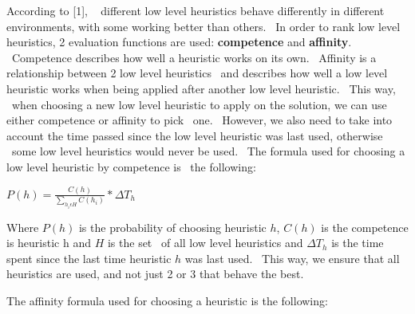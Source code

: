%


 According to [1], \ %
different low level heuristics behave differently in different environments, with some working better than others. \
In order to rank low level heuristics, 2 evaluation functions are used: \textbf{competence} and \textbf{affinity}. \
Competence describes how well a heuristic works on its own. \
Affinity is a relationship between 2 low level heuristics \
and describes how well a low level heuristic works when being applied after another low level heuristic. \
This way, \
when choosing a new low level heuristic to apply on the solution, we can use either competence or affinity to pick \
one. \
However, we also need to take into account the time passed since the low level heuristic was last used, otherwise \
some low level heuristics would never be used. \
The formula used for choosing a low level heuristic by competence is \
the following:

\( P(h) = \frac{C(h)}{\sum_{h_i \epsilon H} C(h_i)} * \Delta T_h \)

Where $P(h)$ is the probability of choosing heuristic $h$, $C(h)$ is the competence is heuristic h and $H$ is the set \
of all low level heuristics and $\Delta T_h$ is the time spent since the last time heuristic $h$ was last used. \
This way, we ensure that all heuristics are used, and not just 2 or 3 that behave the best.

The affinity formula used for choosing a heuristic is the following:

